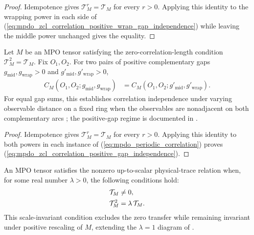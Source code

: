 \begin{proof}
    \leanok
    Idempotence gives $\mathcal T_M^r=\mathcal T_M$ for every $r>0$.
    Applying this identity to the wrapping power in each side of
    (\ref{eq:mpdo_zcl_correlation_positive_wrap_gap_independence}) while
    leaving the middle power unchanged gives the equality.
\end{proof}

\begin{corollary}
    \label{thm:mpdo_zcl_periodic_correlation_positive_gaps_independent}
    \leanok
    Let $M$ be an MPO tensor satisfying the zero-correlation-length
    condition $\mathcal T_M^2=\mathcal T_M$. Fix $O_1,O_2$. For two pairs of positive complementary gaps
    $g_{\mathrm{mid}},g_{\mathrm{wrap}}>0$ and
    $g'_{\mathrm{mid}},g'_{\mathrm{wrap}}>0$,
    \begin{align}
        C_M(O_1,O_2;g_{\mathrm{mid}},g_{\mathrm{wrap}})
         & =C_M(O_1,O_2;g'_{\mathrm{mid}},g'_{\mathrm{wrap}}).
        \label{eq:mpdo_zcl_correlation_positive_gap_independence}
    \end{align}
    For equal gap sums, this establishes correlation independence under varying
    observable distance on a fixed ring when the observables are nonadjacent on
    both complementary arcs \cite[lines~433--500]{Cirac2016MPDO_arXiv}; the
    positive-gap regime is documented in
    \cite{gap:cpsv16_mpdo_zcl_correlation_length_boundary}.
\end{corollary}

\begin{proof}
    \leanok
    Idempotence gives $\mathcal T_M^r=\mathcal T_M$ for every $r>0$.
    Applying this identity to both powers in each instance of
    (\ref{eq:mpdo_periodic_correlation}) proves
    (\ref{eq:mpdo_zcl_correlation_positive_gap_independence}).
\end{proof}

\begin{definition}
    \label{def:mpo_source_zcl}
    \leanok
    An MPO tensor satisfies the nonzero up-to-scalar physical-trace relation
    when, for some real number $\lambda>0$, the following conditions hold:
    \begin{align}
        \mathcal T_M   & \ne 0,
        \notag                                   \\
        \mathcal T_M^2 & =\lambda\,\mathcal T_M.
        \notag
    \end{align}
    This scale-invariant condition excludes the zero transfer while remaining
    invariant under positive rescaling of $M$, extending the $\lambda=1$
    diagram of \cite[Definition~4.2]{Cirac2016MPDO_arXiv}
    \cite{gap:cpsv16_zcl_canonical_form_normalization}.
\end{definition}

